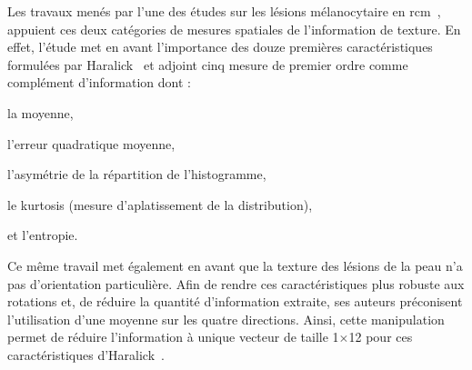 Les travaux menés par l'une des études sur les lésions mélanocytaire en \gls{rcm}~\cite{Wiltgen2008}, appuient ces deux catégories de mesures spatiales de l'information de texture. En effet, l'étude met en avant l'importance des douze premières caractéristiques formulées par Haralick~\cite{Haralick1973} et adjoint cinq mesure de premier ordre comme complément d'information dont :
\begin{inlinerate}
    \item la moyenne,
    \item l'erreur quadratique moyenne,
    \item l'asymétrie de la répartition de l'histogramme,
    \item le kurtosis (mesure d'aplatissement de la distribution),
    \item et l'entropie.
\end{inlinerate}
Ce même travail met également en avant que la texture des lésions de la peau n'a pas d'orientation particulière. Afin de rendre ces caractéristiques plus robuste aux rotations et, de réduire la quantité d'information extraite, ses auteurs préconisent l'utilisation d'une moyenne sur les quatre directions. Ainsi, cette manipulation permet de réduire l'information à unique vecteur de taille 1$\times$12 pour ces caractéristiques d'Haralick~\cite{Wiltgen2008}.\par

